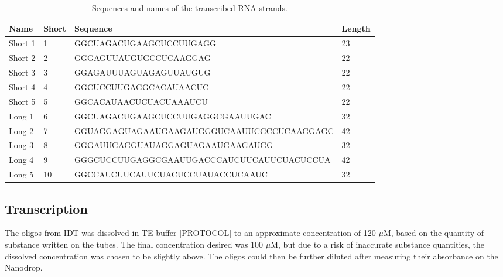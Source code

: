 \begin{table}
\begin{adjustbox}{width=\columnwidth}
\begin{tabular}{llll}
\hline
\textbf{Name}      & \textbf{Short} & \textbf{Sequence}                                           & \textbf{Length} \\
\hline
Short 1            & 1          & GGCUAGACUGAAGCUCCUUGAGG                    & 23     \\
Short 2            & 2          & GGGAGUUAUGUGCCUCAAGGAG                     & 22     \\
Short 3            & 3          & GGAGAUUUAGUAGAGUUAUGUG                     & 22     \\
Short 4            & 4          & GGCUCCUUGAGGCACAUAACUC                     & 22     \\
Short 5            & 5          & GGCACAUAACUCUACUAAAUCU                     & 22     \\
Long 1             & 6          & GGCUAGACUGAAGCUCCUUGAGGCGAAUUGAC           & 32     \\
Long 2             & 7          & GGUAGGAGUAGAAUGAAGAUGGGUCAAUUCGCCUCAAGGAGC & 42     \\
Long 3             & 8          & GGGAUUGAGGUAUAGGAGUAGAAUGAAGAUGG           & 32     \\
Long 4             & 9          & GGGCUCCUUGAGGCGAAUUGACCCAUCUUCAUUCUACUCCUA & 42     \\
Long 5             & 10         & GGCCAUCUUCAUUCUACUCCUAUACCUCAAUC           & 32     \\
\hline
\end{tabular}
\end{adjustbox}
\caption{Sequences and names of the transcribed RNA strands.}
\label{rna_strands}
\end{table}

\subsection{Transcription}

The oligos from IDT was dissolved in TE buffer [PROTOCOL] to an approximate concentration of 120 $\mu$M, based on the quantity of substance written on the tubes. The final concentration desired was 100 $\mu$M, but due to a risk of inaccurate substance quantities, the dissolved concentration was chosen to be slightly above. The oligos could then be further diluted after measuring their absorbance on the Nanodrop.

